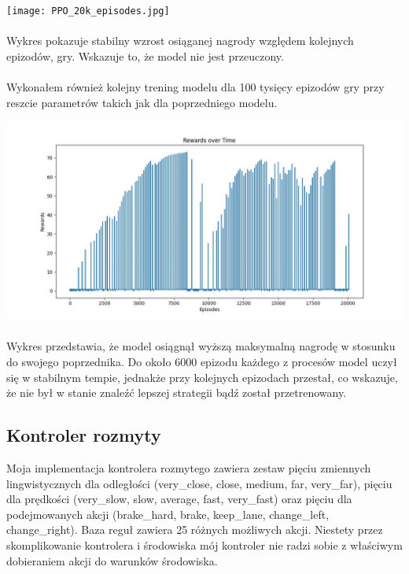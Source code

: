 \documentclass{article}
\begin{document}
\newpage

\texttt{[image: PPO\_20k\_episodes.jpg]}

\paragraph{}
Wykres pokazuje stabilny wzrost osiąganej nagrody względem kolejnych epizodów, gry. Wskazuje to, że model nie jest przeuczony.

\paragraph{}
Wykonałem również kolejny trening modelu dla 100 tysięcy epizodów gry przy reszcie parametrów takich jak dla poprzedniego modelu.

\includegraphics[width=1\linewidth]{PPO.jpg}

\paragraph{}
Wykres przedstawia, że model osiągnął wyższą maksymalną nagrodę w stosunku do swojego poprzednika. Do około 6000 epizodu każdego z procesów model uczył się w stabilnym tempie, jednakże przy kolejnych epizodach przestał, co wskazuje, że nie był w stanie znaleźć lepszej strategii bądź został przetrenowany.


\subsection{Kontroler rozmyty}
Moja implementacja kontrolera rozmytego zawiera zestaw pięciu zmiennych lingwistycznych dla odległości (very\_close, close, medium, far, very\_far), pięciu dla prędkości (very\_slow, slow, average, fast, very\_fast) oraz pięciu dla podejmowanych akcji (brake\_hard, brake, keep\_lane, change\_left, change\_right). Baza reguł zawiera 25 różnych możliwych akcji. Niestety przez skomplikowanie kontrolera i środowiska mój kontroler nie radzi sobie z właściwym dobieraniem akcji do warunków środowiska.
\end{document}
